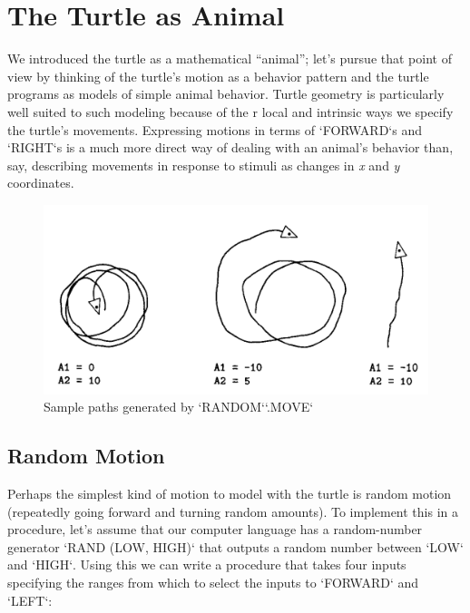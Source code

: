 \documentclass{book}
\begin{document}
\section{The Turtle as Animal}

We introduced the turtle as a mathematical ``animal''; let's pursue that
point of view by thinking of the turtle's motion as a behavior pattern
and the turtle programs as models of simple animal behavior. Turtle
geometry is particularly well suited to such modeling because of the
r local and intrinsic ways we specify the turtle's movements. Expressing
motions in terms of \textsc{`FORWARD`}s and \textsc{`RIGHT`}s is a much more direct way of
dealing with an animal's behavior than, say, describing movements in
response to stimuli as changes in {\em x} and {\em y} coordinates.

\begin{figure}
\begin{center}
\includegraphics[scale=1]{fig2-1}
\caption{Sample paths generated by \textsc{`RANDOM`}\textsc{`.MOVE`}}
\end{center}
\end{figure}

\subsection{Random Motion}

Perhaps the simplest kind of motion to model with the turtle is random
motion (repeatedly going forward and turning random amounts). To
implement this in a procedure, let's assume that our computer language
has a random-number generator \textsc{`RAND (LOW, HIGH)`} that outputs a random
number between \textsc{`LOW`} and \textsc{`HIGH`}. Using this we can write a procedure that
takes four inputs specifying the ranges from which to select the inputs
to \textsc{`FORWARD`} and \textsc{`LEFT`}:
\end{document}
